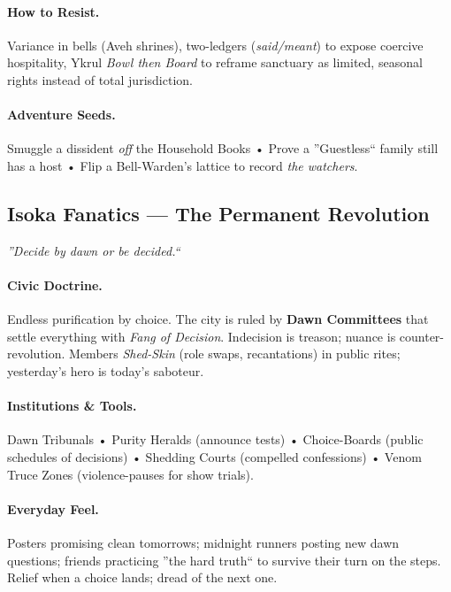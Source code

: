 \documentclass[11pt]{article}
\begin{document}
\paragraph{How to Resist.}
Variance in bells (Aveh shrines), two-ledgers (\emph{said/meant}) to expose coercive hospitality, Ykrul \emph{Bowl then Board} to reframe sanctuary as limited, seasonal rights instead of total jurisdiction.

\paragraph{Adventure Seeds.}
Smuggle a dissident \emph{off} the Household Books • Prove a ''Guestless`` family still has a host • Flip a Bell-Warden's lattice to record \emph{the watchers}.

\subsection*{Isoka Fanatics --- The Permanent Revolution}
\textit{''Decide by dawn or be decided.``}
\paragraph{Civic Doctrine.}
Endless purification by choice. The city is ruled by \textbf{Dawn Committees} that settle everything with \emph{Fang of Decision}. Indecision is treason; nuance is counter-revolution. Members \emph{Shed-Skin} (role swaps, recantations) in public rites; yesterday's hero is today's saboteur.

\paragraph{Institutions \& Tools.}
Dawn Tribunals • Purity Heralds (announce tests) • Choice-Boards (public schedules of decisions) • Shedding Courts (compelled confessions) • Venom Truce Zones (violence-pauses for show trials).

\paragraph{Everyday Feel.}
Posters promising clean tomorrows; midnight runners posting new dawn questions; friends practicing ''the hard truth`` to survive their turn on the steps. Relief when a choice lands; dread of the next one.
\end{document}
